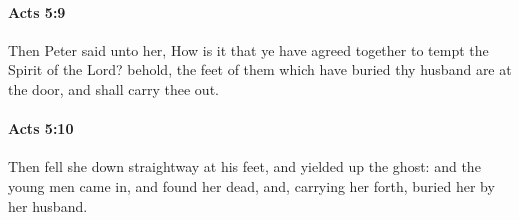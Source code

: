 		\paragraph{Acts 5:9} %
			\label{ACTS-5-9}

			Then Peter said unto her, How is it that ye have agreed together to tempt the Spirit of the Lord?  behold, the feet of them which have buried thy husband are at the door, and shall carry thee out.

			\begin{framed}
			\scriptsize
				\begin{compactdesc}
					\item[SBLG] 
				\end{compactdesc}
			\end{framed}

		\paragraph{Acts 5:10} %
			\label{ACTS-5-10}

			Then fell she down straightway at his feet, and yielded up the ghost: and the young men came in, and found her dead, and, carrying her forth, buried her by her husband.

